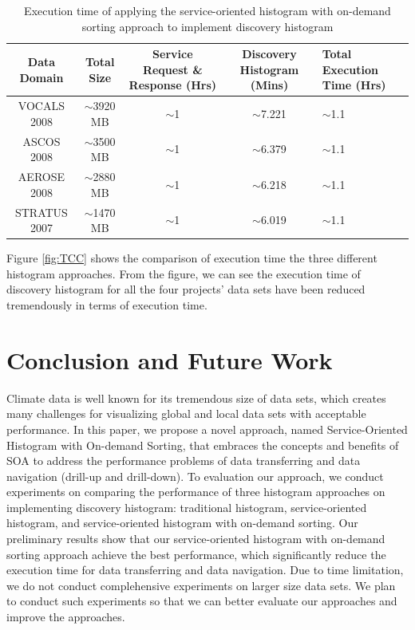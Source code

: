 \documentclass[times, 10pt,onecolumn]{article} %
\begin{document}
\begin{enumerate}
\begin{table}[!iht]
\centering
\begin{tabular}{|c|c|c|c|p{3cm}|}
\hline
\textbf{Data Domain} & \textbf{Total Size} &\textbf{ Service Request \& Response (Hrs)}  & \textbf{Discovery Histogram (Mins)} & \textbf{Total Execution Time (Hrs)}  \\ \hline
VOCALS 2008 &  $\sim$3920 MB & $\sim$1 & $\sim$7.221 & $\sim$1.1\\ \hline
ASCOS 2008 & $\sim$3500 MB & $\sim$1 & $\sim$6.379& $\sim$1.1\\ \hline 
AEROSE 2008 & $\sim$2880 MB & $\sim$1 & $\sim$6.218&  $\sim$1.1 \\\hline 
STRATUS 2007 & $\sim$1470 MB & $\sim$1  & $\sim$6.019&  $\sim$1.1\\\hline
\end{tabular}
\caption{ Execution time of applying the service-oriented histogram with on-demand sorting approach to implement discovery histogram}
\label{tbl:3rdStr}
\end{table}

\end{enumerate}

Figure \ref{fig:TCC} shows the comparison of execution time the three different histogram approaches. From the figure, we can see the execution time of discovery histogram for all the four projects' data sets have been reduced tremendously in terms of execution time. 

\section{Conclusion and Future Work}
Climate data is well known for its tremendous size of data sets, which creates many challenges for visualizing global and local data sets with acceptable performance. In this paper, we propose a novel approach, named Service-Oriented Histogram with On-demand Sorting, that embraces the concepts and benefits of SOA to address the performance problems of data transferring and data navigation (drill-up and drill-down). To evaluation our approach, we conduct experiments on comparing the performance of three histogram approaches on implementing discovery histogram: traditional histogram, service-oriented histogram, and service-oriented histogram with on-demand sorting. Our preliminary results show that our service-oriented histogram with on-demand sorting approach achieve the best performance, which significantly reduce the execution time for data transferring and data navigation. Due to time limitation, we do not conduct complehensive experiments on larger size data sets. We plan to conduct such experiments so that we can better evaluate our approaches and improve the approaches.



\end{document}
